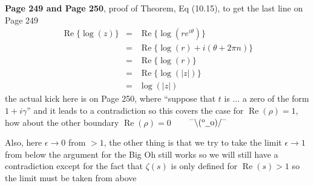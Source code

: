 \documentclass[aps,preprint,preprintnumbers,nofootinbib,showpacs,prd]{revtex4-1}
\newcommand{\nbea}{\begin{eqnarray*}}
\newcommand{\neea}{\end{eqnarray*}}
\newcommand{\dunno}{$ {}^{\mbox {--}}\backslash(^{\rm o}{}\underline{\hspace{0.2cm}}{\rm o})/^{\mbox {--}}$}
\DeclareMathOperator{\re}{Re}
\begin{document}
{\bf Page 249 and Page 250}, proof of Theorem, Eq (10.15), to get the last line on Page 249
%
\nbea
\re\{\log(z)\} & = & \re \{\log(r e^{i\theta})\} \\
& = & \re\{\log(r) + i(\theta + 2\pi n)\} \\
& = & \re\{\log(r)\} \\
& = & \re\{\log(|z|)\} \\
& = & \log(|z|)
\neea
%
the actual kick here is on Page 250, where ``suppose that $t$ is $\ldots$ a zero of the form $1+i\gamma$'' and it leads to a contradiction so this covers the case for $\re(\rho) = 1$, how about the other boundary $\re(\rho) = 0$ ~~~ \dunno

Also, here $\epsilon\to0$ from $> 1$, the other thing is that we try to take the limit $\epsilon\to1$ from below the argument for the Big Oh still works so we will still have a contradiction except for the fact that $\zeta(s)$ is only defined for $\re(s) > 1$ so the limit must be taken from above
\end{document}
